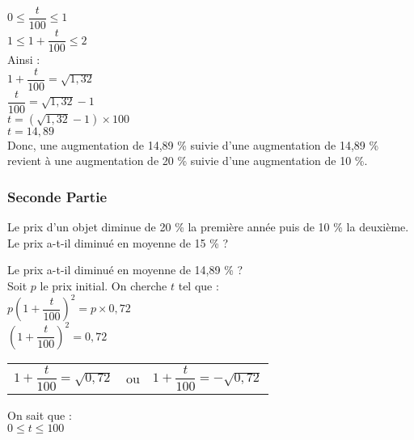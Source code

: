 $ 0 \leq \dfrac{t}{100} \leq 1 $ \\

$ 1 \leq 1 + \dfrac{t}{100} \leq 2 $ \\

Ainsi : \\

$1 + \dfrac{t}{100} = \sqrt{1,32} $ \\

$\dfrac{t}{100} = \sqrt{1,32} - 1 $ \\

$ t = \left(\sqrt{1,32} - 1 \right) \times 100 $ \\

$ t = 14,89 $ \\

Donc, une augmentation de 14,89 \% suivie d'une augmentation de 14,89 \% revient à une augmentation de 20 \% suivie d'une augmentation de 10 \%. 

\newpage

\subsubsection*{Seconde Partie}

Le prix d'un objet diminue de 20 \% la première année puis de 10 \% la deuxième. \\

Le prix a-t-il diminué en moyenne de 15 \% ? 

Le prix a-t-il diminué en moyenne de 14,89 \% ? \\

Soit $p$ le prix initial. On cherche $t$ tel que : \\

$p\left(1 + \dfrac{t}{100} \right)^2 = p \times 0,72 $ \\

$\left(1 + \dfrac{t}{100} \right)^2 = 0,72 $ \\

\begin{tabular}{lcl}
$1 + \dfrac{t}{100} = \sqrt{0,72} $ & ou & $1 + \dfrac{t}{100} = -\sqrt{0,72} $ \\
\end{tabular}

\vspace{.3cm}

On sait que : \\

$ 0 \leq t \leq 100 $ \\


